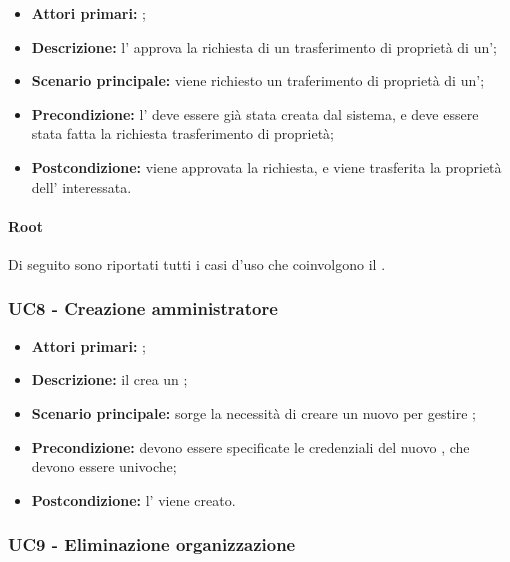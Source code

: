 \documentclass[../analisi-dei-requisiti]{subfiles}
\begin{document}
\begin{itemize}
\item \textbf{Attori primari:} ;
\item \textbf{Descrizione:} l' approva la richiesta di un trasferimento di proprietà di un';
\item \textbf{Scenario principale:} viene richiesto un traferimento di proprietà di un';
\item \textbf{Precondizione:} l' deve essere già stata creata dal sistema, e deve essere stata fatta la richiesta trasferimento di proprietà;
\item \textbf{Postcondizione:} viene approvata la richiesta, e viene trasferita la proprietà dell' interessata.

\end{itemize}
\paragraph{Root}
Di seguito sono riportati tutti i casi d'uso che coinvolgono il  .

\subsubsection{UC8 - Creazione amministratore}
\label{subsub:UC8}

\begin{itemize}
\item \textbf{Attori primari:} ;
\item \textbf{Descrizione:} il  crea un  ;
\item \textbf{Scenario principale:} sorge la necessità di creare un nuovo  per gestire ;
\item \textbf{Precondizione:} devono essere specificate le credenziali del nuovo , che devono essere univoche;
\item \textbf{Postcondizione:} l' viene creato.

\end{itemize}

\subsubsection{UC9 - Eliminazione organizzazione}
\label{subsub:UC9}
\end{document}
